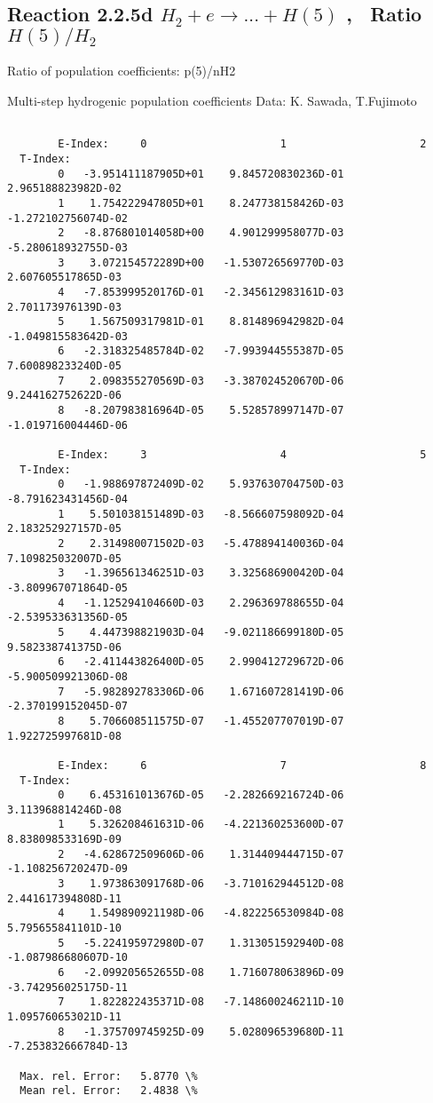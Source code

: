 \documentclass[12pt,dvipdfmx]{article}
\begin{document}
\subsection{
Reaction 2.2.5d  $H_2 + e \rightarrow ...+ H(5)  $ , \  Ratio $H(5)/H_2 $
}

 Ratio of population coefficients: p(5)/nH2

 Multi-step hydrogenic population coefficients
 Data: K. Sawada, T.Fujimoto \cite{kn:Sawada}


\begin{small}\begin{verbatim}

        E-Index:     0                     1                     2
  T-Index:
        0   -3.951411187905D+01    9.845720830236D-01    2.965188823982D-02
        1    1.754222947805D+01    8.247738158426D-03   -1.272102756074D-02
        2   -8.876801014058D+00    4.901299958077D-03   -5.280618932755D-03
        3    3.072154572289D+00   -1.530726569770D-03    2.607605517865D-03
        4   -7.853999520176D-01   -2.345612983161D-03    2.701173976139D-03
        5    1.567509317981D-01    8.814896942982D-04   -1.049815583642D-03
        6   -2.318325485784D-02   -7.993944555387D-05    7.600898233240D-05
        7    2.098355270569D-03   -3.387024520670D-06    9.244162752622D-06
        8   -8.207983816964D-05    5.528578997147D-07   -1.019716004446D-06

        E-Index:     3                     4                     5
  T-Index:
        0   -1.988697872409D-02    5.937630704750D-03   -8.791623431456D-04
        1    5.501038151489D-03   -8.566607598092D-04    2.183252927157D-05
        2    2.314980071502D-03   -5.478894140036D-04    7.109825032007D-05
        3   -1.396561346251D-03    3.325686900420D-04   -3.809967071864D-05
        4   -1.125294104660D-03    2.296369788655D-04   -2.539533631356D-05
        5    4.447398821903D-04   -9.021186699180D-05    9.582338741375D-06
        6   -2.411443826400D-05    2.990412729672D-06   -5.900509921306D-08
        7   -5.982892783306D-06    1.671607281419D-06   -2.370199152045D-07
        8    5.706608511575D-07   -1.455207707019D-07    1.922725997681D-08

        E-Index:     6                     7                     8
  T-Index:
        0    6.453161013676D-05   -2.282669216724D-06    3.113968814246D-08
        1    5.326208461631D-06   -4.221360253600D-07    8.838098533169D-09
        2   -4.628672509606D-06    1.314409444715D-07   -1.108256720247D-09
        3    1.973863091768D-06   -3.710162944512D-08    2.441617394808D-11
        4    1.549890921198D-06   -4.822256530984D-08    5.795655841101D-10
        5   -5.224195972980D-07    1.313051592940D-08   -1.087986680607D-10
        6   -2.099205652655D-08    1.716078063896D-09   -3.742956025175D-11
        7    1.822822435371D-08   -7.148600246211D-10    1.095760653021D-11
        8   -1.375709745925D-09    5.028096539680D-11   -7.253832666784D-13

  Max. rel. Error:   5.8770 \%
  Mean rel. Error:   2.4838 \%



\end{verbatim}\end{small}
\end{document}
